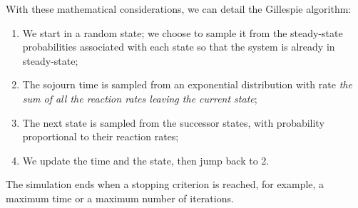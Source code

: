     With these mathematical considerations, we can detail the Gillespie algorithm:
    \begin{enumerate}
        \item We start in a random state; we choose to sample it from the steady-state probabilities associated with each state so that the system is already in steady-state;
        \item The sojourn time is sampled from an exponential distribution with rate \emph{the sum of all the reaction rates leaving the current state};
        \item The next state is sampled from the successor states, with probability proportional to their reaction rates;
        \item We update the time and the state, then jump back to 2.
    \end{enumerate}
    The simulation ends when a stopping criterion is reached, for example, a maximum time or a maximum number of iterations.
    